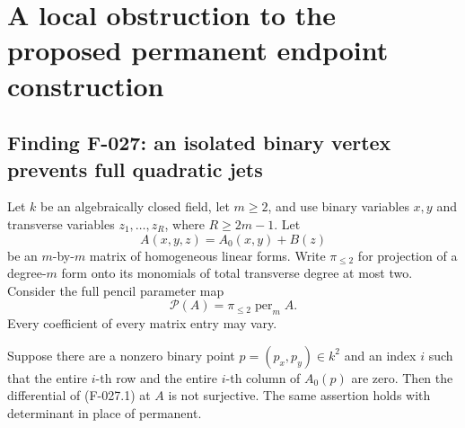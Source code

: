 \section{A local obstruction to the proposed permanent endpoint construction}

\subsection*{Finding F-027: an isolated binary vertex prevents full quadratic jets}
Let \(k\) be an algebraically closed field, let \(m\geq2\),
and use binary variables \(x,y\) and transverse variables
\(z_1,\ldots,z_R\), where \(R\geq2m-1\).
Let
\[
 A(x,y,z)=A_0(x,y)+B(z)
\]
be an \(m\)-by-\(m\) matrix of homogeneous linear forms.
Write \(\pi_{\leq2}\) for projection of a degree-\(m\)
form onto its monomials of total transverse degree at most
two. Consider the full pencil parameter map
\[
 \mathcal P(A)=\pi_{\leq2}\operatorname{per}_m A .
                                                               \tag{F-027.1}
\]
Every coefficient of every matrix entry may vary.

Suppose there are a nonzero binary point
\(p=(p_x,p_y)\in k^2\) and an index \(i\) such that
the entire \(i\)-th row and the entire \(i\)-th column of
\(A_0(p)\) are zero. Then the differential of (F-027.1)
at \(A\) is not surjective. The same assertion holds
with determinant in place of permanent.

